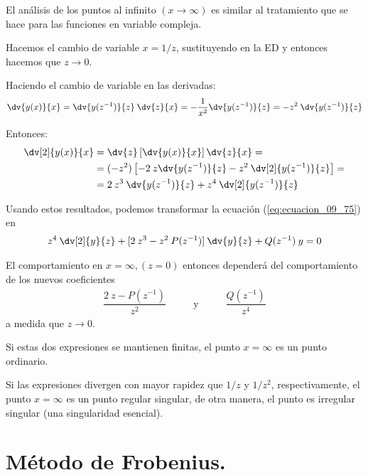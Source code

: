 El análisis de los puntos al infinito $(x \to \infty)$ es similar al tratamiento que se hace para las funciones en variable compleja.

Hacemos el cambio de variable $x = 1/z$, sustituyendo en la ED y entonces hacemos que $z \to 0$. 

Haciendo el cambio de variable en las derivadas:
\begin{align}
\dv{y(x)}{x} = \dv{y(z^{-1})}{z} \: \dv{z}{x} = - \dfrac{1}{x^{2}} \dv{y(z^{-1})}{z} = -z^{2} \: \dv{y(z^{-1})}{z}
\label{eq:ecuacion_09_76}
\end{align}

Entonces:
\begin{align}
\begin{aligned}
\dv[2]{y(x)}{x} &= \dv{z} \left[ \dv{y(x)}{x} \right] \dv{z}{x} = \\
&= (-z^{2}) \left[ -2 \: z \dv{y(z^{-1})}{z} - z^{2} \: \dv[2]{y(z^{-1})}{z} \right] = \\
&= 2 \: z^{3} \: \dv{y(z^{-1})}{z} + z^{4} \: \dv[2]{y(z^{-1})}{z}
\end{aligned}
\label{eq:ecuacion_09_77}
\end{align}

Usando estos resultados, podemos transformar la ecuación (\ref{eq:ecuacion_09_75}) en
\begin{align}
z^{4} \: \dv[2]{y}{z} + [ 2 \: z^{3} - z^{2} \: P(z^{-1})] \: \dv{y}{z} + Q(z^{-1}) \: y = 0
\label{eq:ecuacion_09_78}
\end{align}

El comportamiento en $x = \infty, (z = 0)$ entonces dependerá del comportamiento de los nuevos coeficientes
\begin{align*}
\dfrac{2 \: z - P(z^{-1})}{z^{2}} \hspace{1cm} \text{ y } \hspace{1cm} \dfrac{Q(z^{-1})}{z^{4}}
\end{align*}
a medida que $z \to 0$.

Si estas dos expresiones se mantienen finitas, el punto $x = \infty$ es un punto ordinario.

Si las expresiones divergen con mayor rapidez que $1/z$ y $1/z^{2}$, respectivamente, el punto $x = \infty$ es un punto regular singular, de otra manera, el punto es irregular singular (una singularidad esencial).

\section{Método de Frobenius.}
